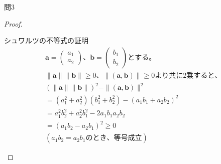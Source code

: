 \documentclass[dvipdfmx,uplatex]{jsarticle}
\begin{document}
  \newpage
  \centerline{\large 問3}
  \begin{proof}
    \begin{flushleft}
      シュワルツの不等式の証明\\
      \begin{equation}
        \begin{aligned}
          &\bm{a}=\begin{pmatrix} {a}_{1} \\ {a}_{2} \end{pmatrix}、\bm{b}=\begin{pmatrix} {b}_{1} \\ {b}_{2} \end{pmatrix}とする。\nonumber\\
          &\|\bm{a}\| \|\bm{b}\| \geq 0、\|(\bm{a},\bm{b})\| \geq 0より共に2乗すると、\nonumber\\
          &( \|\bm{a}\| \|\bm{b}\| )^2 - \|(\bm{a},\bm{b})\|^2\nonumber\\
          &=({a}_{1}^2 + {a}_{2}^2)({b}_{1}^2 + {b}_{2}^2) - ({a}_{1} {b}_{1} + {a}_{2} {b}_{2})^2\nonumber\\
          &= {a}_{1}^2 {b}_{2}^2 + {a}_{2}^2 {b}_{1}^2 - 2 {a}_{1} {b}_{1} {a}_{2} {b}_{2}\nonumber\\
          &= ({a}_{1} {b}_{2} - {a}_{2} {b}_{1})^2 \geq 0\nonumber\\
          &({a}_{1} {b}_{2} = {a}_{2} {b}_{1}のとき、等号成立)\nonumber
        \end{aligned}
      \end{equation}
    \end{flushleft}
  \end{proof}
\end{document}
